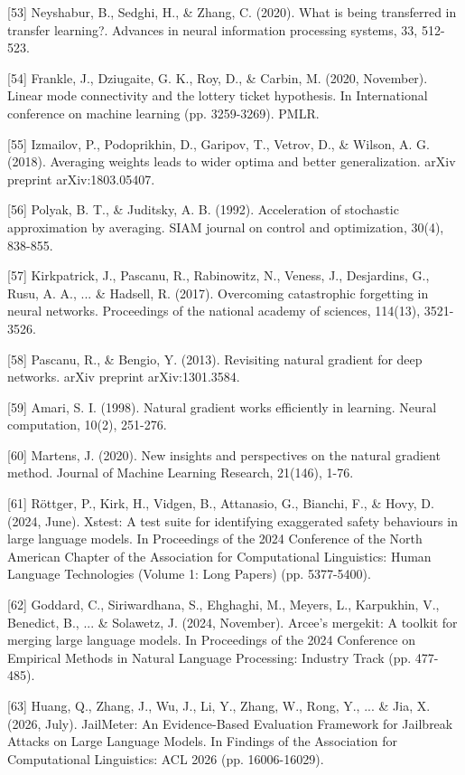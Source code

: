 [53] Neyshabur, B., Sedghi, H., \& Zhang, C. (2020). What is being transferred in transfer learning?. Advances in neural information processing systems, 33, 512-523.

[54] Frankle, J., Dziugaite, G. K., Roy, D., \& Carbin, M. (2020, November). Linear mode connectivity and the lottery ticket hypothesis. In International conference on machine learning (pp. 3259-3269). PMLR.

[55] Izmailov, P., Podoprikhin, D., Garipov, T., Vetrov, D., \& Wilson, A. G. (2018). Averaging weights leads to wider optima and better generalization. arXiv preprint arXiv:1803.05407.

[56] Polyak, B. T., \& Juditsky, A. B. (1992). Acceleration of stochastic approximation by averaging. SIAM journal on control and optimization, 30(4), 838-855.

[57] Kirkpatrick, J., Pascanu, R., Rabinowitz, N., Veness, J., Desjardins, G., Rusu, A. A., ... \& Hadsell, R. (2017). Overcoming catastrophic forgetting in neural networks. Proceedings of the national academy of sciences, 114(13), 3521-3526.

[58] Pascanu, R., \& Bengio, Y. (2013). Revisiting natural gradient for deep networks. arXiv preprint arXiv:1301.3584.

[59] Amari, S. I. (1998). Natural gradient works efficiently in learning. Neural computation, 10(2), 251-276.

[60] Martens, J. (2020). New insights and perspectives on the natural gradient method. Journal of Machine Learning Research, 21(146), 1-76.

[61] Röttger, P., Kirk, H., Vidgen, B., Attanasio, G., Bianchi, F., \& Hovy, D. (2024, June). Xstest: A test suite for identifying exaggerated safety behaviours in large language models. In Proceedings of the 2024 Conference of the North American Chapter of the Association for Computational Linguistics: Human Language Technologies (Volume 1: Long Papers) (pp. 5377-5400).

[62] Goddard, C., Siriwardhana, S., Ehghaghi, M., Meyers, L., Karpukhin, V., Benedict, B., ... \& Solawetz, J. (2024, November). Arcee’s mergekit: A toolkit for merging large language models. In Proceedings of the 2024 Conference on Empirical Methods in Natural Language Processing: Industry Track (pp. 477-485).

[63] Huang, Q., Zhang, J., Wu, J., Li, Y., Zhang, W., Rong, Y., ... \& Jia, X. (2026, July). JailMeter: An Evidence-Based Evaluation Framework for Jailbreak Attacks on Large Language Models. In Findings of the Association for Computational Linguistics: ACL 2026 (pp. 16006-16029).










